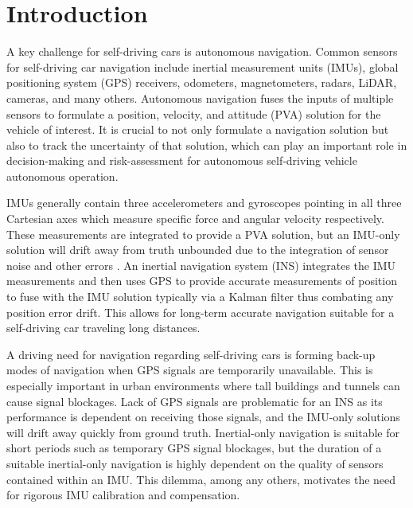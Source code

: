 
\begingroup
\allowdisplaybreaks


\section{Introduction}

A key challenge for self-driving cars is autonomous navigation. Common sensors for self-driving car navigation include inertial measurement units (IMUs), global positioning system (GPS) receivers, odometers, magnetometers, radars, LiDAR, cameras, and many others. Autonomous navigation fuses the inputs of multiple sensors to formulate a position, velocity, and attitude (PVA) solution for the vehicle of interest. It is crucial to not only formulate a navigation solution but also to track the uncertainty of that solution, which can play an important role in decision-making and risk-assessment for autonomous self-driving vehicle autonomous operation.

IMUs generally contain three accelerometers and gyroscopes pointing in all three Cartesian axes which measure specific force and angular velocity respectively. These measurements are integrated to provide a PVA solution, but an IMU-only solution will drift away from truth unbounded due to the integration of sensor noise and other errors \cite{groves2013principles}. An inertial navigation system (INS) integrates the IMU measurements and then uses GPS to provide accurate measurements of position to fuse with the IMU solution typically via a Kalman filter thus combating any position error drift. This allows for long-term accurate navigation suitable for a self-driving car traveling long distances.

A driving need for navigation regarding self-driving cars is forming back-up modes of navigation when GPS signals are temporarily unavailable. This is especially important in urban environments where tall buildings and tunnels can cause signal blockages. Lack of GPS signals are problematic for an INS as its performance is dependent on receiving those signals, and the IMU-only solutions will drift away quickly from ground truth. Inertial-only navigation is suitable for short periods such as temporary GPS signal blockages, but the duration of a suitable inertial-only navigation is highly dependent on the quality of sensors contained within an IMU. This dilemma, among any others, motivates the need for rigorous IMU calibration and compensation.


